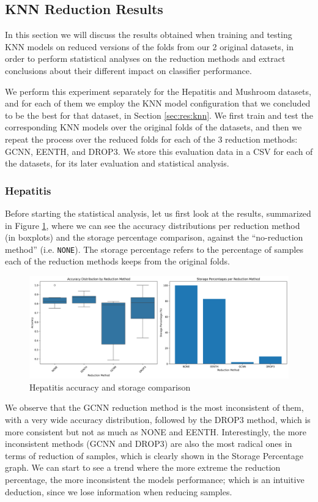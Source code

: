 \subsection{KNN Reduction Results}
In this section we will discuss the results obtained when training and testing KNN models on reduced versions of the folds from our 2 original datasets, in order to perform statistical analyses on the reduction methods and extract conclusions about their different impact on classifier performance.

We perform this experiment separately for the Hepatitis and Mushroom datasets, and for each of them we employ the KNN model configuration that we concluded to be the best for that dataset, in Section \ref{sec:res:knn}. We first train and test the corresponding KNN models over the original folds of the datasets, and then we repeat the process over the reduced folds for each of the 3 reduction methods: GCNN, EENTH, and DROP3. We store this evaluation data in a CSV for each of the datasets, for its later evaluation and statistical analysis.

\subsubsection{Hepatitis}
Before starting the statistical analysis, let us first look at the results, summarized in Figure \ref{fig:hep:reduction}, where we can see the accuracy distributions per reduction method (in boxplots) and the storage percentage comparison, against the ``no-reduction method'' (i.e. \texttt{NONE}). The storage percentage refers to the percentage of samples each of the reduction methods keeps from the original folds.
\begin{figure}[H]
    \centering
    \includegraphics[width=\textwidth]{figures/knn/hepatitis/accuracy_storage_comparison.png}
    \caption{Hepatitis accuracy and storage comparison}
    \label{fig:hep:reduction}
\end{figure}

We observe that the GCNN reduction method is the most inconsistent of them, with a very wide accuracy distribution, followed by the DROP3 method, which is more consistent but not as much as NONE and EENTH. Interestingly, the more inconsistent methods (GCNN and DROP3) are also the most radical ones in terms of reduction of samples, which is clearly shown in the Storage Percentage graph. We can start to see a trend where the more extreme the reduction percentage, the more inconsistent the models performance; which is an intuitive deduction, since we lose information when reducing samples.

